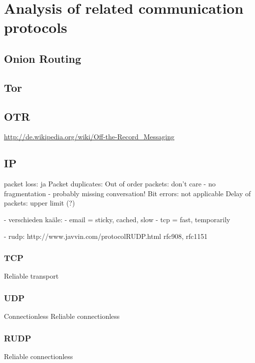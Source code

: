\chapter{Analysis of related communication protocols}
\section{Onion Routing}
\section{Tor}
\section{OTR}
\url{http://de.wikipedia.org/wiki/Off-the-Record_Messaging}
\section{IP}

packet loss: ja
Packet duplicates:
Out of order packets: don't care - no fragmentation
    - probably missing conversation!
    Bit errors: not applicable
    Delay of packets: upper limit (?) 


    - verschieden kaäle:
        - email = sticky, cached, slow
            - tcp = fast, temporarily

            - rudp:
                http://www.javvin.com/protocolRUDP.html
                        rfc908, rfc1151

\subsection{TCP}
Reliable transport
\subsection{UDP}
Connectionless
Reliable connectionless\cite{rfc768}
\subsection{RUDP}
Reliable connectionless\cite{rfc908,rfc1151}

